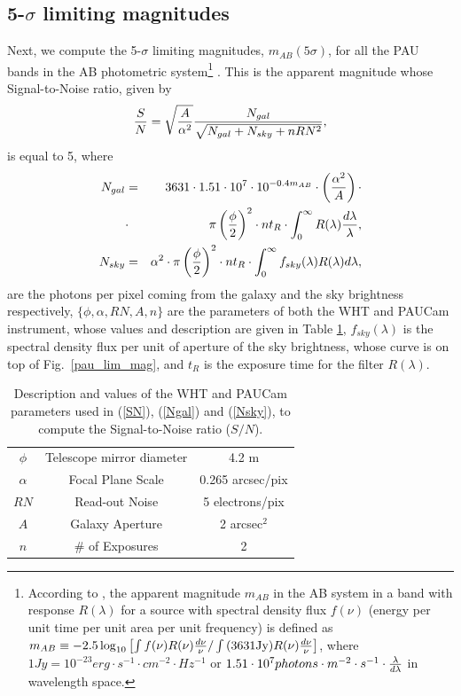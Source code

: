 \subsection{5-$\sigma$ limiting magnitudes}
Next, we compute the 5-$\sigma$ limiting magnitudes, $m_{AB}(5\sigma)$, for all the PAU bands in the AB photometric system\footnote{According to \citet{Hogg1996}, the apparent magnitude $m_{AB}$ in the AB system in a band with response $R(\lambda)$ for a source with spectral density flux $f(\nu)$ (energy per unit time per unit area per unit frequency) is defined as $m_{AB} \equiv-2.5\log_{10}\left[\int f(\nu) R(\nu){d\nu \over\nu} / \int \text{(3631Jy)} R(\nu){d\nu \over\nu}\right]$, where $1Jy = 10^{-23} erg\cdot s^{-1} \cdot cm^{-2} \cdot Hz^{-1}$ or $1.51 \cdot 10^7 photons\cdot m^{-2} \cdot s^{-1} \cdot {\lambda \over d\lambda}$ in wavelength space.} \citep{Oke1970}. This is the apparent magnitude whose Signal-to-Noise ratio, given by
\begin{equation}
{S \over N} = \sqrt{A \over \alpha^2}{N_{gal} \over \sqrt{N_{gal} + N_{sky} + n RN^2} },
\label{SN}
\end{equation}
is equal to 5, where 
\begin{eqnarray}
N_{gal} &=& 3631 \cdot 1.51\cdot10^7  \cdot 10^{-0.4m_{AB}} \cdot \left({\alpha^2\over A}\right) \cdot \nonumber \\
&\cdot& \pi\left({\phi \over 2}\right)^2 \cdot nt_R \cdot \int^{\infty}_0 R(\lambda) {d\lambda \over \lambda} \label{Ngal}, \label{Ngal} \\
N_{sky} &=& \alpha^2 \cdot \pi\left({\phi \over 2}\right)^2 \cdot nt_R \cdot \int^{\infty}_0 f_{sky}(\lambda) R(\lambda) d\lambda, \label{Nsky}
\end{eqnarray}
are the photons per pixel coming from the galaxy and the sky brightness  respectively, $\lbrace \phi, \alpha, RN, A, n \rbrace$ are the parameters of both the WHT and PAUCam instrument, whose values and description are given in Table \ref{PAU_parameters}, $f_{sky}(\lambda)$ is the spectral density flux per unit of aperture of the sky brightness, whose curve is on top of Fig.~\ref{pau_lim_mag}, and $t_R$ is the exposure time for the filter $R(\lambda)$. 
\begin{table}
\caption{Description and values of the WHT and PAUCam parameters used in (\ref{SN}), (\ref{Ngal}) and (\ref{Nsky}), to compute the Signal-to-Noise ratio ($S/N$).}
\vspace*{12pt}
\centering
\begin{tabular}{ccc}
\hline
 $\phi$ & Telescope mirror diameter & 4.2 m \\
$\alpha$ & Focal Plane Scale & 0.265 arcsec/pix \\
$RN$ & Read-out Noise & 5 electrons/pix \\
$A$ & Galaxy Aperture & 2 arcsec$^2$ \\
$n$ & \# of Exposures & 2 \\
\hline
\end{tabular}
\label{PAU_parameters}
\end{table}
